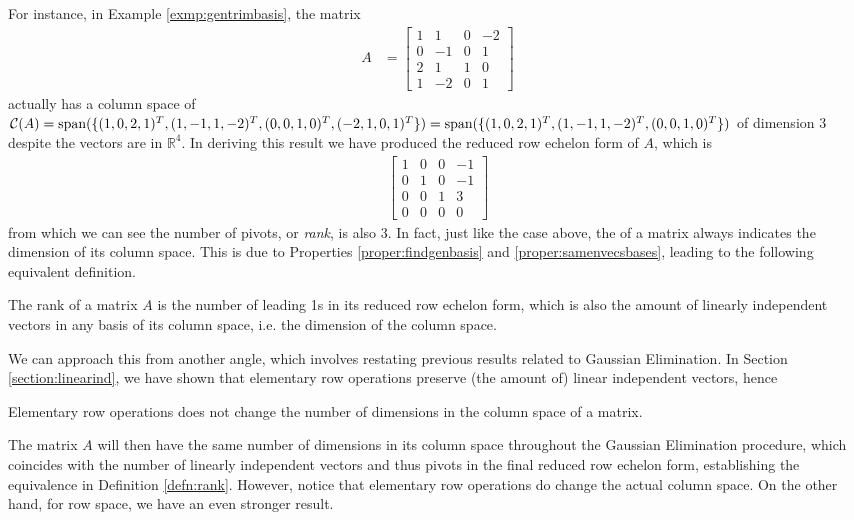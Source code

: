 For instance, in Example \ref{exmp:gentrimbasis}, the matrix
\begin{align*}
A &= 
\begin{bmatrix}
1 & 1 & 0 & -2\\
0 & -1 & 0 & 1\\
2 & 1 & 1 & 0\\
1 & -2 & 0 & 1
\end{bmatrix}
\end{align*}
actually has a column space of $\mathcal{C}(A) = \text{span}(\{(1,0,2,1)^T, (1,-1,1,-2)^T, \\ (0,0,1,0)^T, (-2,1,0,1)^T\}) = \text{span}(\{(1,0,2,1)^T, (1,-1,1,-2)^T, (0,0,1,0)^T\})$ of dimension $3$ despite the vectors are in $\mathbb{R}^4$. In deriving this result we have produced the reduced row echelon form of $A$, which is 
\begin{align*}
\begin{bmatrix}
1 & 0 & 0 & -1\\
0 & 1 & 0 & -1\\
0 & 0 & 1 & 3\\
0 & 0 & 0 & 0 
\end{bmatrix}
\end{align*}
from which we can see the number of pivots, or \textit{rank}, is also $3$. In fact, just like the case above, the  of a matrix always indicates the dimension of its column space. This is due to Properties \ref{proper:findgenbasis} and \ref{proper:samenvecsbases}, leading to the following equivalent definition.
\begin{defn}[Rank]
\label{defn:rank}
The rank of a matrix $A$ is the number of leading 1s in its reduced row echelon form, which is also the amount of linearly independent vectors in any basis of its column space, i.e. the dimension of the column space.
\end{defn}
We can approach this from another angle, which involves restating previous results related to Gaussian Elimination. In Section \ref{section:linearind}, we have shown that elementary row operations preserve (the amount of) linear independent vectors, hence
\begin{proper}
\label{proper:elemrowopcolrank}
Elementary row operations does not change the number of dimensions in the column space of a matrix.
\end{proper}
The matrix $A$ will then have the same number of dimensions in its column space throughout the Gaussian Elimination procedure, which coincides with the number of linearly independent vectors and thus pivots in the final reduced row echelon form, establishing the equivalence in Definition \ref{defn:rank}. However, notice that elementary row operations do change the actual column space. On the other hand, for row space, we have an even stronger result.
